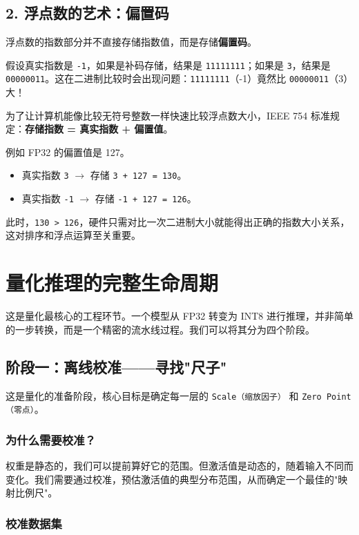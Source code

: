 \documentclass[fontset=fandol,11pt,a4paper]{ctexart}
\newcommand{\keyword}[1]{\textbf{\color{Primary}#1}}
\newcommand{\concept}[1]{\textbf{\color{Accent}#1}}
\newcommand{\codeinline}[1]{\texttt{\color{Primary!80}#1}}
\begin{document}
\subsection{2. 浮点数的艺术：偏置码}

浮点数的指数部分并不直接存储指数值，而是存储\concept{偏置码}。

假设真实指数是 \codeinline{-1}，如果是补码存储，结果是 \codeinline{11111111}；如果是 \codeinline{3}，结果是 \codeinline{00000011}。这在二进制比较时会出现问题：\codeinline{11111111}（-1）竟然比 \codeinline{00000011}（3）大！

为了让计算机能像比较无符号整数一样快速比较浮点数大小，IEEE 754 标准规定：\keyword{存储指数 = 真实指数 + 偏置值}。

例如 FP32 的偏置值是 127。
\begin{itemize}
  \item 真实指数 \codeinline{3} $\rightarrow$ 存储 \codeinline{3 + 127 = 130}。
  \item 真实指数 \codeinline{-1} $\rightarrow$ 存储 \codeinline{-1 + 127 = 126}。
\end{itemize}

此时，\codeinline{130 > 126}，硬件只需对比一次二进制大小就能得出正确的指数大小关系，这对排序和浮点运算至关重要。

\section{量化推理的完整生命周期}

这是量化最核心的工程环节。一个模型从 FP32 转变为 INT8 进行推理，并非简单的一步转换，而是一个精密的流水线过程。我们可以将其分为四个阶段。

\subsection{阶段一：离线校准——寻找"尺子"}

这是量化的准备阶段，核心目标是确定每一层的 \codeinline{Scale（缩放因子）} 和 \codeinline{Zero Point（零点）}。

\subsubsection{为什么需要校准？}

权重是静态的，我们可以提前算好它的范围。但激活值是动态的，随着输入不同而变化。我们需要通过校准，预估激活值的典型分布范围，从而确定一个最佳的"映射比例尺"。

\subsubsection{校准数据集}
\end{document}
